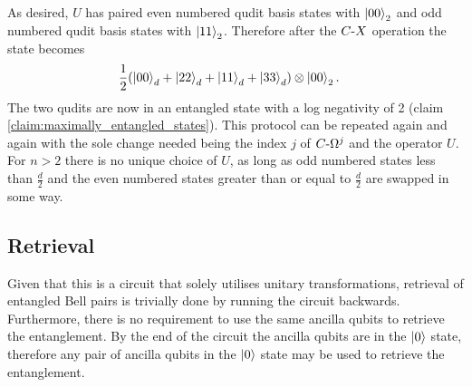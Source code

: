As desired, $U$ has paired even numbered qudit basis states with $\ket{00}_2$ and odd numbered qudit basis states with $\ket{11}_2$.
Therefore after the $C\text{-}X$ operation the state becomes
\begin{align}
    &\frac{1}{2}
    (\ket{00}_d + \ket{22}_d + \ket{11}_d + \ket{33}_d)
    \otimes\ket{00}_2.
\end{align}
The two qudits are now in an entangled state with a log negativity of 2 (claim \ref{claim:maximally_entangled_states}).
This protocol can be repeated again and again with the sole change needed being the index $j$ of $C\text{-}\Omega^j$ and the operator $U$.
For $n>2$ there is no unique choice of $U$, as long as odd numbered states less than $\frac{d}{2}$ and the even numbered states greater than or equal to $\frac{d}{2}$ are swapped in some way.

\subsection{Retrieval}
\label{subsection:aqcretrieval}
Given that this is a circuit that solely utilises unitary transformations, retrieval of entangled Bell pairs is trivially done by running the circuit backwards. Furthermore, there is no requirement to use the same ancilla qubits to retrieve the entanglement. By the end of the circuit the ancilla qubits are in the $\ket{0}$ state, therefore any pair of ancilla qubits in the $\ket{0}$ state may be used to retrieve the entanglement.